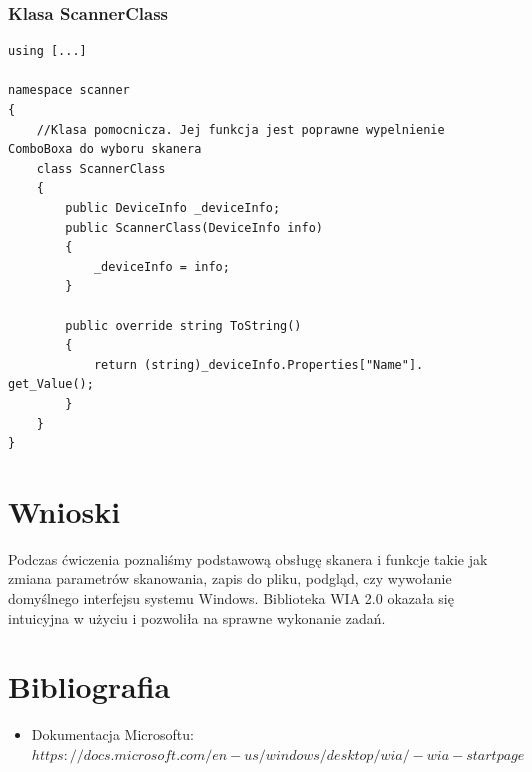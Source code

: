 \documentclass[12pt,a4paper,notitlepage]{report}
\begin{document}
\begin{adjustwidth}{0pt}{-50pt}
\subsubsection{Klasa ScannerClass}
\begin{lstlisting}
using [...]

namespace scanner
{
    //Klasa pomocnicza. Jej funkcja jest poprawne wypelnienie ComboBoxa do wyboru skanera
    class ScannerClass
    {
        public DeviceInfo _deviceInfo;
        public ScannerClass(DeviceInfo info)
        {
            _deviceInfo = info;
        }

        public override string ToString()
        {
            return (string)_deviceInfo.Properties["Name"]. get_Value();
        }
    }
}
\end{lstlisting}

\end{adjustwidth}
\newpage
\section{Wnioski}
Podczas ćwiczenia poznaliśmy podstawową obsługę skanera i funkcje takie jak zmiana parametrów skanowania, zapis do pliku, podgląd, czy wywołanie domyślnego interfejsu systemu Windows. Biblioteka WIA 2.0 okazała się intuicyjna w użyciu i pozwoliła na sprawne wykonanie zadań.
\section{Bibliografia}
\begin{itemize}
\item Dokumentacja Microsoftu:
\\
$https://docs.microsoft.com/en-us/windows/desktop/wia/-wia-startpage$
\end{itemize}
\end{document}
